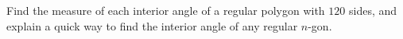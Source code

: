 Find the measure of each interior angle of a regular polygon with $120$ sides, and explain a quick way to find the interior angle of any regular $n$-gon.
